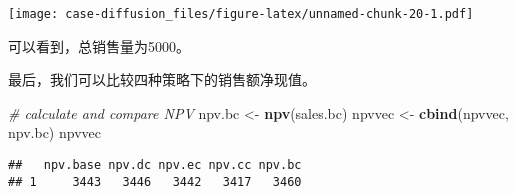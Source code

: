 \documentclass[]{article}
\newenvironment{Shaded}{\begin{snugshade}}{\end{snugshade}}
\newcommand{\CommentTok}[1]{\textcolor[rgb]{0.56,0.35,0.01}{\textit{#1}}}
\newcommand{\KeywordTok}[1]{\textcolor[rgb]{0.13,0.29,0.53}{\textbf{#1}}}
\newcommand{\NormalTok}[1]{#1}
\newcommand{\StringTok}[1]{\textcolor[rgb]{0.31,0.60,0.02}{#1}}
\begin{document}
\texttt{[image: case-diffusion\_files/figure-latex/unnamed-chunk-20-1.pdf]}

可以看到，总销售量为5000。

最后，我们可以比较四种策略下的销售额净现值。

\begin{Shaded}
\begin{Highlighting}[]
\CommentTok{# calculate and compare NPV}
\NormalTok{npv.bc <-}\StringTok{ }\KeywordTok{npv}\NormalTok{(sales.bc)}
\NormalTok{npvvec <-}\StringTok{ }\KeywordTok{cbind}\NormalTok{(npvvec, npv.bc)}
\NormalTok{npvvec}
\end{Highlighting}
\end{Shaded}

\begin{verbatim}
##   npv.base npv.dc npv.ec npv.cc npv.bc
## 1     3443   3446   3442   3417   3460
\end{verbatim}
\end{document}
